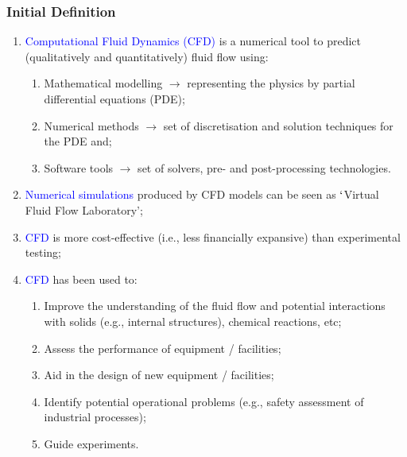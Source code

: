 \documentclass[10pt,compress,handout,ignorenonframetext]{beamer}
\begin{document}
\begin{frame}
 \frametitle{Initial Definition}

\begin{enumerate}
\item <1->\textcolor{blue}{Computational Fluid Dynamics (CFD)} is a numerical tool to predict (qualitatively and quantitatively) fluid flow using:
\begin{enumerate}
\item <2-> Mathematical modelling $\rightarrow$ representing the physics by partial differential equations (PDE);
\item <3-> Numerical methods $\rightarrow$ set of discretisation and solution techniques for the PDE and;
\item <4-> Software tools $\rightarrow$ set of solvers, pre- and post-processing technologies.
\end{enumerate}
\item <5-> \textcolor{blue}{Numerical simulations} produced by CFD models can be seen as $\lq$Virtual Fluid Flow Laboratory';
\item <6-> \textcolor{blue}{CFD} is more cost-effective (i.e., less financially expansive) than experimental testing;
\item <7-> \textcolor{blue}{CFD} has been used to:
\begin{enumerate}
\item <8-> Improve the understanding of the fluid flow and potential interactions with solids (e.g., internal structures), chemical reactions, etc;
\item <9-> Assess the performance of equipment / facilities;
\item <10-> Aid in the design of new equipment / facilities;
\item <11-> Identify potential operational problems (e.g., safety assessment of industrial processes);
\item <12-> Guide experiments.
\end{enumerate}

\end{enumerate}
 
\end{frame}
\end{document}
